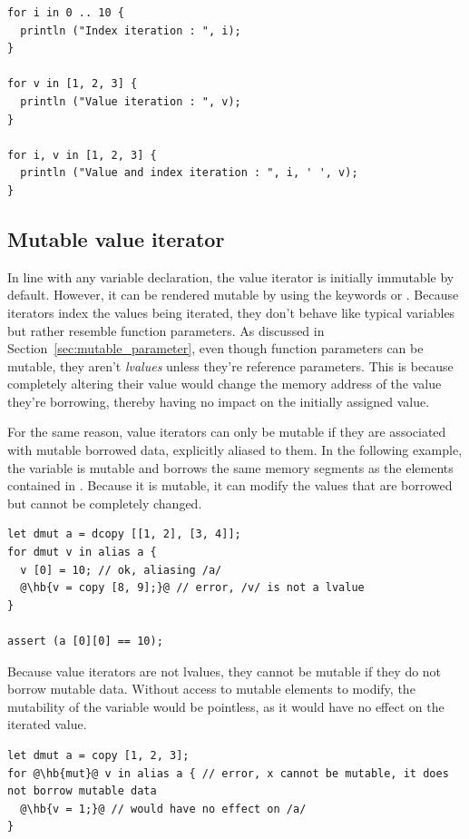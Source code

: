 \begin{lstlisting}[style=coloredverbatim, escapechar=@]
for i in 0 .. 10 {
  println ("Index iteration : ", i);
}

for v in [1, 2, 3] {
  println ("Value iteration : ", v);
}

for i, v in [1, 2, 3] {
  println ("Value and index iteration : ", i, ' ', v);
}
\end{lstlisting}

\subsection {Mutable value iterator}
\label{sec:mut_value_iterators}

In line with any variable declaration, the value iterator is initially immutable
by default. However, it can be rendered mutable by using the keywords
 or . Because iterators index the values being iterated,
they don't behave like typical variables but rather resemble function
parameters. As discussed in Section~\ref{sec:mutable_parameter}, even though
function parameters can be mutable, they aren't \textit{lvalues} unless they're
reference parameters. This is because completely altering their value would
change the memory address of the value they're borrowing, thereby having no
impact on the initially assigned value.

For the same reason, value iterators can only be mutable if they are associated
with mutable borrowed data, explicitly aliased to them. In the following
example, the variable  is mutable and borrows the same memory segments
as the elements contained in . Because it is mutable, it can modify
the values that are borrowed but cannot be completely changed.

\begin{lstlisting}[style=coloredverbatim, escapechar=@]
let dmut a = dcopy [[1, 2], [3, 4]];
for dmut v in alias a {
  v [0] = 10; // ok, aliasing /a/
  @\hb{v = copy [8, 9];}@ // error, /v/ is not a lvalue
}

assert (a [0][0] == 10);
\end{lstlisting}

Because value iterators are not lvalues, they cannot be mutable if they do not
borrow mutable data. Without access to mutable elements to modify, the
mutability of the variable would be pointless, as it would have no effect on the
iterated value.

\begin{lstlisting}[style=coloredverbatim, escapechar=@, caption=Useless mutable iterator, label=lst:(chap7):useless_mut_iterator]
let dmut a = copy [1, 2, 3];
for @\hb{mut}@ v in alias a { // error, x cannot be mutable, it does not borrow mutable data
  @\hb{v = 1;}@ // would have no effect on /a/
}
\end{lstlisting}

